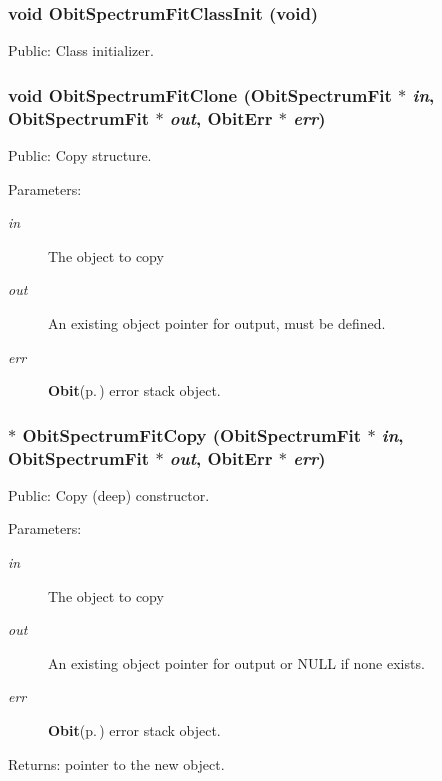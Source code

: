 \subsubsection{\setlength{\rightskip}{0pt plus 5cm}void Obit\-Spectrum\-Fit\-Class\-Init (void)}\label{ObitSpectrumFit_8h_a8}


Public: Class initializer. 

\subsubsection{\setlength{\rightskip}{0pt plus 5cm}void Obit\-Spectrum\-Fit\-Clone ({\bf Obit\-Spectrum\-Fit} $\ast$ {\em in}, {\bf Obit\-Spectrum\-Fit} $\ast$ {\em out}, {\bf Obit\-Err} $\ast$ {\em err})}\label{ObitSpectrumFit_8h_a13}


Public: Copy structure. 

\begin{Desc}
\item[Parameters:]
\begin{description}
\item[{\em in}]The object to copy \item[{\em out}]An existing object pointer for output, must be defined. \item[{\em err}]{\bf Obit}{\rm (p.\,\pageref{structObit})} error stack object. \end{description}
\end{Desc}
\subsubsection{$\ast$ Obit\-Spectrum\-Fit\-Copy ({\bf Obit\-Spectrum\-Fit} $\ast$ {\em in}, {\bf Obit\-Spectrum\-Fit} $\ast$ {\em out}, {\bf Obit\-Err} $\ast$ {\em err})}\label{ObitSpectrumFit_8h_a12}


Public: Copy (deep) constructor. 

\begin{Desc}
\item[Parameters:]
\begin{description}
\item[{\em in}]The object to copy \item[{\em out}]An existing object pointer for output or NULL if none exists. \item[{\em err}]{\bf Obit}{\rm (p.\,\pageref{structObit})} error stack object. \end{description}
\end{Desc}
\begin{Desc}
\item[Returns:]pointer to the new object. \end{Desc}
